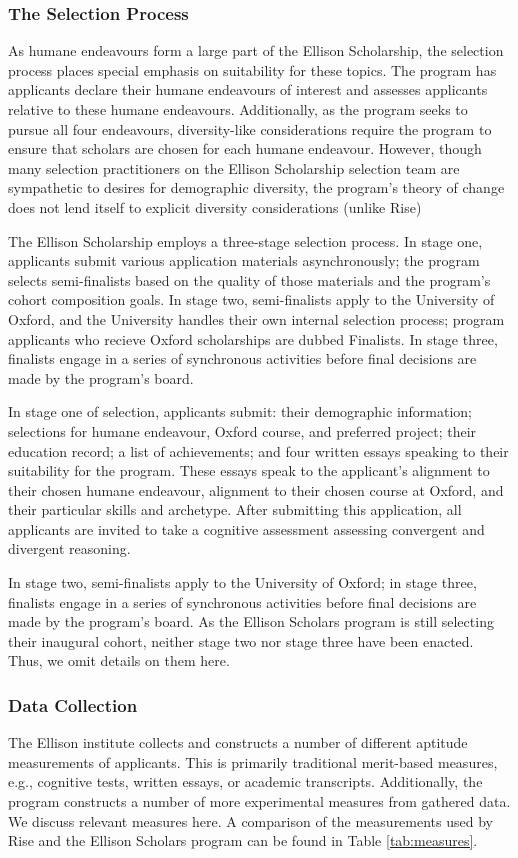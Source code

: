 \subsubsection{The Selection Process}
As humane endeavours form a large part of the Ellison Scholarship, the selection process places special emphasis on suitability for these topics. The program has applicants declare their humane endeavours of interest and assesses applicants relative to these humane endeavours. Additionally, as the program seeks to pursue all four endeavours, diversity-like considerations require the program to ensure that scholars are chosen for each humane endeavour. However, though many selection practitioners on the Ellison Scholarship selection team are sympathetic to desires for demographic diversity, the program's theory of change does not lend itself to explicit diversity considerations (unlike Rise)

The Ellison Scholarship employs a three-stage selection process. In stage one, applicants submit various application materials asynchronously; the program selects semi-finalists based on the quality of those materials and the program's cohort composition goals. In stage two, semi-finalists apply to the University of Oxford, and the University handles their own internal selection process; program applicants who recieve Oxford scholarships are dubbed Finalists. In stage three, finalists engage in a series of synchronous activities before final decisions are made by the program's board. 

In stage one of selection, applicants submit: their demographic information; selections for humane endeavour, Oxford course, and preferred project; their education record; a list of achievements; and four written essays speaking to their suitability for the program. These essays speak to the applicant's alignment to their chosen humane endeavour, alignment to their chosen course at Oxford, and their particular skills and archetype. After submitting this application, all applicants are invited to take a cognitive assessment assessing convergent and divergent reasoning.

In stage two, semi-finalists apply to the University of Oxford; in stage three, finalists engage in a series of synchronous activities before final decisions are made by the program's board. As the Ellison Scholars program is still selecting their inaugural cohort, neither stage two nor stage three have been enacted. Thus, we omit details on them here. 

\subsubsection{Data Collection}
The Ellison institute collects and constructs a number of different aptitude measurements of applicants. This is primarily traditional merit-based measures, e.g., cognitive tests, written essays, or academic transcripts. Additionally, the program constructs a number of more experimental measures from gathered data. We discuss relevant measures here. A comparison of the measurements used by Rise and the Ellison Scholars program can be found in Table \ref{tab:measures}.

